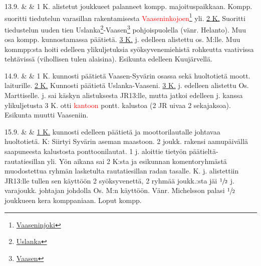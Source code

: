 \documentclass[11pt,a5paper,oneside]{book}
\begin{document}
13.9. & & 1 K. alistetut joukkueet palanneet kompp. majoituspaikkaan. Kompp. suoritti tiedutelun varasillan rakentamisesta \textcolor{red}{Vaaseninkojoen}\footnote{\href{https://www.google.fi/maps/place/Reka+Vazhinka/@60.9717912,34.0093844,5359m/}{Vaaseninjoki}} yli. \newline\newline \underline{2 K.} Suoritti tiedustelun uuden tien Uslanka\footnote{\href{https://www.google.fi/maps/place/6\%C2\%B058'32.7\%22N+33\%C2\%B054'02.8\%22E/@60.976793,33.8997559,17z/}{Uslanka}}-Vaasen\footnote{\href{https://www.google.fi/maps/place/Vaaseni,+Leningradin+alue,+Ven\%C3\%A4j\%C3\%A4,+187742/@60.9621216,34.0129134,15z/}{Vaasen}} pohjoispuolella (vänr. Helanto). Muu osa kompp. kunnostamassa päätietä. \newline\newline \underline{3 K.}  j. edelleen alistettu os. M:lle. Muu kommpp:sta hoiti edelleen ylikuljetuksia syöksyvenemiehistä rohkeutta vaativissa tehtävissä (vihollisen tulen alaisina).  \newline\newline Esikunta edelleen Kuujärvellä. \\

\newpage

14.9. & & 1 K. kunnosti päätietä Vaasen-Syvärin osassa sekä huoltotietä moott. laiturille. \newline\newline \underline{2 K.} Kunnosti päätietä Uslanka-Vaaseni. \newline\newline \underline{3 K.}  j. edelleen alistettu Os. Marttiselle.  j. sai käskyn alistuksesta JR13:lle, mutta jatkoi edelleen  j. kanssa ylikuljetusta 3 K. otti \textcolor{red}{kantoon} pontt. kalustoa (2 JR uivaa 2 sekajaksoa). Esikunta muutti Vaaseniin. \\

\taulustop


15.9. & & \underline{1 K.} kunnosti edelleen päätietä ja moottorilautalle johtavaa huoltotietä. \newline{} K: Siirtyi Syvärin aseman maastoon. 2 joukk. rakensi aamupäivällä saapuneesta kalustosta ponttoonilautat. 1 j. aloittie tietyön päätieltä-rautatiesillan yli. Yön aikana sai 2 K:sta ja esikunnan komentoryhmästä muodostettua ryhmän lasketulta rautatiesillan radan tasalle. \newline{} K.  j. alistettiin JR13:lle tullen sen käyttöön 2 syöksyvenettä, 2 ryhmää  joukk.:sta jäi $\sfrac{1}{2}$ j. varajoukk. johtajan johdolla Os. M:n käyttöön. Vänr. Michelsson palasi $\sfrac{1}{2}$ joukkueen kera komppaniaan. Loput kompp. \\
\end{document}
